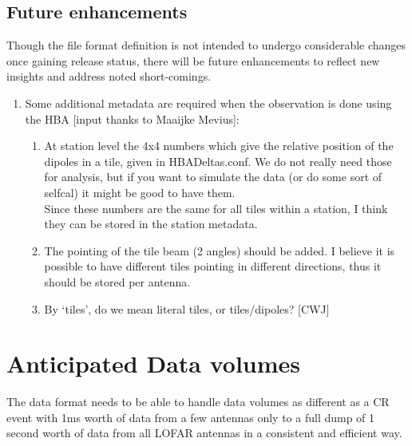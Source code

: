 \documentclass[a4paper,10pt,bibtotoc]{scrartcl}
\begin{document}
\subsection{Future enhancements}

Though the file format definition is not intended to undergo
considerable changes once gaining release status, there will be future
enhancements to reflect new insights and address noted short-comings.

\begin{enumerate}
\item Some additional metadata are required when the observation is
  done using the HBA [input thanks to Maaijke Mevius]:
  \begin{enumerate}
  \item At station level the 4x4 numbers which give the relative
    position of the dipoles in a tile, given in HBADeltas.conf. We do
    not really need those for analysis, but if you want to simulate
    the data (or do some sort of selfcal) it might be good to have
    them. \\
    Since these numbers are the same for all tiles within a station, I
    think they can be stored in the station metadata.
  \item The pointing of the tile beam (2 angles) should be added. I
    believe it is possible to have different tiles pointing in
    different directions, thus it should be stored per antenna.
  \item By `tiles', do we mean literal tiles, or tiles/dipoles? [CWJ]
  \end{enumerate}
\end{enumerate}


\clearpage


\section{Anticipated Data volumes}

The data format needs to be able to handle data volumes as different as a
CR event with 1ms worth of data from a few antennas only to a full dump of 1
second worth of data from all LOFAR antennas in a consistent and efficient way.
\end{document}
